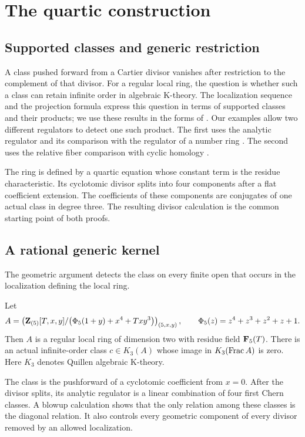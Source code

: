 \section{The quartic construction}\label{d2:sec:introduction}

\subsection*{Supported classes and generic restriction}

A class pushed forward from a Cartier divisor vanishes after restriction to the complement of that divisor. For a regular local ring, the question is whether such a class can retain infinite order in algebraic K-theory. The localization sequence and the projection formula express this question in terms of supported classes and their products; we use these results in the forms of \cite[V.3--V.6]{Weibel}. Our examples allow two different regulators to detect one such product. The first uses the analytic regulator and its comparison with the regulator of a number ring \cite{Borel,BunkeTamme}. The second uses the relative fiber comparison with cyclic homology \cite{AMMN,BGTTrace}.

The ring is defined by a quartic equation whose constant term is the residue characteristic. Its cyclotomic divisor splits into four components after a flat coefficient extension. The coefficients of these components are conjugates of one actual class in degree three. The resulting divisor calculation is the common starting point of both proofs.

\subsection{A rational generic kernel}

The geometric argument detects the class on every finite open that occurs in the localization defining the local ring.

\begin{theorem}\label{d2:thm:geometric}
Let
\[
 A=
 \left(
 \mathbf{Z}_{(5)}[T,x,y]/
 \bigl(\Phi _5(1+y)+x^4+Txy^3\bigr)
 \right)_{(5,x,y)},
 \qquad
 \Phi _5(z)=z^4+z^3+z^2+z+1.
\]
Then \(A\) is a regular local ring of dimension two with residue field
\(\mathbf{F} _5(T)\). There is an actual infinite-order class
\(c\in K_3(A)\) whose image in \(K_3(\operatorname{Frac} A)\) is zero.
Here \(K_3\) denotes Quillen algebraic K-theory.
\end{theorem}

The class is the pushforward of a cyclotomic coefficient from \(x=0\).
After the divisor splits, its analytic regulator is a linear combination
of four first Chern classes. A blowup calculation shows that the only
relation among these classes is the diagonal relation. It also controls
every geometric component of every divisor removed by an allowed
localization.

